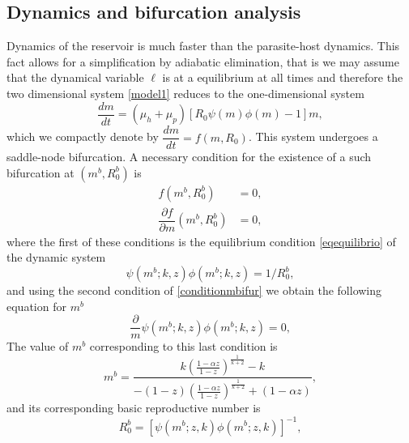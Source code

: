 \documentclass[eng]{MMSB-class-eng}
\begin{document}
{}



\subsection{Dynamics and bifurcation analysis}\label{bifurcacion}

{\color{blue}
 Dynamics of the reservoir is much faster than the parasite-host dynamics. This fact allows for a simplification by adiabatic elimination, that is we may assume that the dynamical variable $\ell$ is at a equilibrium at all times and therefore the two dimensional system \eqref{model1} reduces to the one-dimensional system 
\begin{equation*}
\dfrac{dm}{dt}=(\mu_h + \mu_p)\left[ R_0  \psi(m)\phi(m) -1 \right] m,
\end{equation*}
which we compactly denote by
$\dfrac{dm}{dt}=f(m,R_0)$.
This system undergoes a saddle-node bifurcation. 
A necessary condition for the existence of a such bifurcation at 
$(m^{b},R_0^b)$ is
\begin{equation}\label{conditionmbifur}
\begin{split}
f(m^b,R_0^b)&=0,\\
\dfrac{\partial f}{\partial m}(m^b,R_0^b)&=0,
\end{split}
\end{equation}
where the first of these conditions is the equilibrium condition \eqref{eqequilibrio} of the dynamic system
\begin{equation*}
\psi(m^b;k,z)\phi(m^b;k,z)=1/R_0^b,
\end{equation*}
and using the second condition of \eqref{conditionmbifur} we obtain the following equation for $m^b$
\begin{equation}
\frac{\partial }{m}\psi(m^b;k,z)\phi(m^b;k,z)=0,	
\end{equation}
The value of $m^b$ corresponding to this last condition is
\begin{equation}
m^b=\dfrac{k\left( \frac{1-\alpha z}{1-z}\right)^{\frac{1}{k+2}} - k}{-(1-z)\left( \frac{1-\alpha z}{1-z}\right)^{\frac{1}{k+2}} + (1-\alpha z)},	
\end{equation}
and its corresponding basic reproductive number is
\begin{equation}
R_0^b=\left[ \psi(m^b;z,k)\phi(m^b;z,k)\right]^{-1},
\end{equation}	

}
\end{document}
